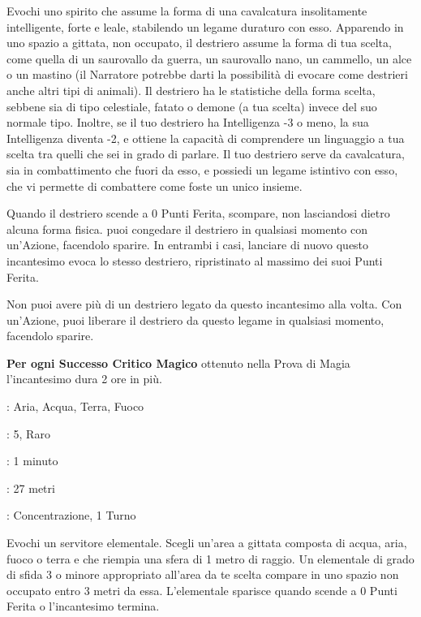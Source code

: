\begin{multicols}{2}
Evochi uno spirito che assume la forma di una cavalcatura insolitamente intelligente, forte e leale, stabilendo un legame duraturo con esso. Apparendo in uno spazio a gittata, non occupato, il destriero assume la forma di tua scelta, come quella di un saurovallo da guerra, un saurovallo nano, un cammello, un alce o un mastino (il Narratore potrebbe darti la possibilità di evocare come destrieri anche altri tipi di animali). Il destriero ha le statistiche della forma scelta, sebbene sia di tipo celestiale, fatato o demone (a tua scelta) invece del suo normale tipo. Inoltre, se il tuo destriero ha Intelligenza -3 o meno, la sua Intelligenza diventa -2, e ottiene la capacità di comprendere un linguaggio a tua scelta tra quelli che sei in grado di parlare. Il tuo destriero serve da cavalcatura, sia in combattimento che fuori da esso, e possiedi un legame istintivo con esso, che vi permette di combattere come foste un unico insieme.

Quando il destriero scende a 0 Punti Ferita, scompare, non lasciandosi dietro alcuna forma fisica. puoi congedare il destriero in qualsiasi momento con un'Azione, facendolo sparire. In entrambi i casi, lanciare di nuovo questo incantesimo evoca lo stesso destriero, ripristinato al massimo dei suoi Punti Ferita.

Non puoi avere più di un destriero legato da questo incantesimo alla volta. Con un'Azione, puoi liberare il destriero da questo legame in qualsiasi momento, facendolo sparire.

\textbf{Per ogni Successo Critico Magico} ottenuto nella Prova di Magia l'incantesimo dura 2 ore in più.

\noindent\colorbox{OBSSgold!10}{
\begin{minipage}{0.95\linewidth}
\begin{description}[noitemsep, topsep=0pt, parsep=0pt, partopsep=0pt, leftmargin=0cm, labelwidth=1.3cm]
	\item[\textbf{Lista}]: Aria, Acqua, Terra, Fuoco
	\item[\textbf{Livello}]: 5, Raro
	\item[\textbf{Lancio}]: 1 minuto
	\item[\textbf{Gittata}]: 27 metri
	\item[\textbf{Durata}]: Concentrazione, 1 Turno
\end{description}
\end{minipage}}\smallskip

Evochi un servitore elementale. Scegli un'area a gittata composta di acqua, aria, fuoco o terra e che riempia una sfera di 1 metro di raggio. Un elementale di grado di sfida 3 o minore appropriato all'area da te scelta compare in uno spazio non occupato entro 3 metri da essa. L'elementale sparisce quando scende a 0 Punti Ferita o l'incantesimo termina.


\end{multicols}
